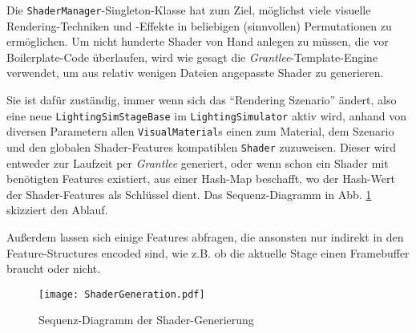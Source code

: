 	
	Die \lstinline|ShaderManager|-Singleton-Klasse hat zum Ziel, möglichst viele visuelle Rendering-Techniken und -Effekte 
	in beliebigen (sinnvollen) Permutationen zu ermöglichen. Um nicht hunderte Shader
	von Hand anlegen zu müssen, die vor Boilerplate-Code überlaufen, wird wie gesagt die
	\emph{Grantlee}-Template-Engine verwendet, um aus relativ wenigen Dateien angepasste Shader zu generieren.
	
	Sie ist dafür zuständig, immer wenn sich das "`Rendering Szenario"' ändert, also eine neue 
	\lstinline|LightingSimStageBase| im \lstinline|LightingSimulator| aktiv wird,  anhand von diversen Parametern
	allen \lstinline|VisualMaterial|s einen zum Material, dem Szenario und den globalen Shader-Features
	kompatiblen \lstinline|Shader| zuzuweisen. Dieser wird entweder zur Laufzeit
	per \emph{Grantlee} generiert, oder wenn schon ein Shader mit benötigten Features existiert, aus einer
	Hash-Map beschafft, wo der Hash-Wert der Shader-Features als Schlüssel dient.
	Das Sequenz-Diagramm in Abb. \ref{fig:shaderGen} skizziert den Ablauf.
	
	Außerdem lassen sich einige Features abfragen, die ansonsten nur indirekt in den Feature-Structures
	encoded sind, wie z.B. ob die aktuelle Stage einen Framebuffer braucht oder nicht.
	
	\begin{figure}[!h]
	\texttt{[image: ShaderGeneration.pdf]}
	\caption{Sequenz-Diagramm der Shader-Generierung}
	\label{fig:shaderGen}
	\end{figure}
	
